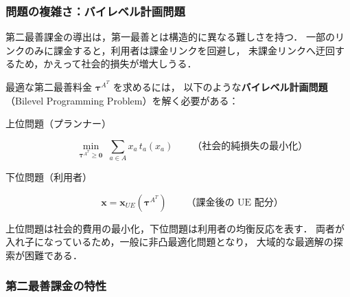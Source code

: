 \subsubsection*{問題の複雑さ：バイレベル計画問題}

第二最善課金の導出は，第一最善とは構造的に異なる難しさを持つ．
一部のリンクのみに課金すると，利用者は課金リンクを回避し，
未課金リンクへ迂回するため，かえって社会的損失が増大しうる\cite{Sheffi1985}．

最適な第二最善料金 $\boldsymbol{\tau}^{A^T}$ を求めるには，
以下のような\textbf{バイレベル計画問題}（Bilevel Programming Problem）を解く必要がある：

\begin{description}
  \item[上位問題（プランナー）]
    \begin{equation}
      \min_{\boldsymbol{\tau}^{A^T} \geq \mathbf{0}}\;
      \sum_{a \in A} x_a\, t_a(x_a)
      \qquad \text{（社会的純損失の最小化）}
      \label{eq:second-best-upper}
    \end{equation}
  \item[下位問題（利用者）]
    \begin{equation}
      \boldsymbol{x} = \boldsymbol{x}_{UE}(\boldsymbol{\tau}^{A^T})
      \qquad \text{（課金後の UE 配分）}
      \label{eq:second-best-lower}
    \end{equation}
\end{description}

上位問題は社会的費用の最小化，下位問題は利用者の均衡反応を表す．
両者が入れ子になっているため，一般に非凸最適化問題となり，
大域的な最適解の探索が困難である\cite{Sheffi1985}．

\subsubsection*{第二最善課金の特性}

